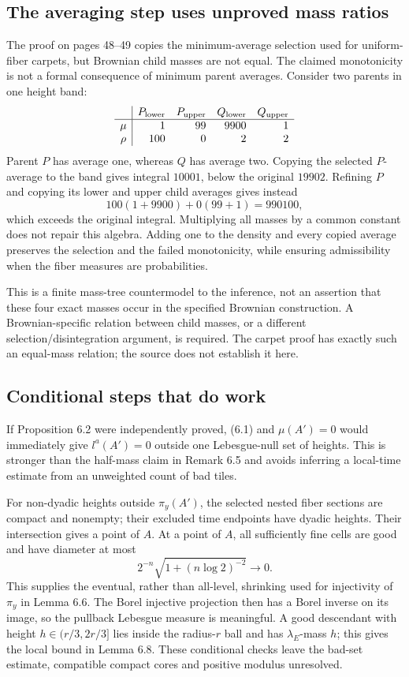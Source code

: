 \documentclass[10pt]{article}
\begin{document}
\subsection*{The averaging step uses unproved mass ratios}
The proof on pages 48–49 copies the minimum-average selection used for uniform-fiber carpets, but Brownian child masses are not equal. The claimed monotonicity is not a formal consequence of minimum parent averages. Consider two parents in one height band: \[\begin{array}{c|rrrr}
 &P_{\rm lower}&P_{\rm upper}&Q_{\rm lower}&Q_{\rm upper}\\
\hline
 \mu&1&99&9900&1\\
 \rho&100&0&2&2
\end{array}\] Parent \(P\) has average one, whereas \(Q\) has average two. Copying the selected \(P\)-average to the band gives integral \(10001\), below the original \(19902\). Refining \(P\) and copying its lower and upper child averages gives instead \[100(1+9900)+0(99+1)=990100,\] which exceeds the original integral. Multiplying all masses by a common constant does not repair this algebra. Adding one to the density and every copied average preserves the selection and the failed monotonicity, while ensuring admissibility when the fiber measures are probabilities.\par
This is a finite mass-tree countermodel to the inference, not an assertion that these four exact masses occur in the specified Brownian construction. A Brownian-specific relation between child masses, or a different selection/disintegration argument, is required. The carpet proof has exactly such an equal-mass relation; the source does not establish it here.\par
\subsection*{Conditional steps that do work}
If Proposition 6.2 were independently proved, (6.1) and \(\mu(A')=0\) would immediately give \(l^a(A')=0\) outside one Lebesgue-null set of heights. This is stronger than the half-mass claim in Remark 6.5 and avoids inferring a local-time estimate from an unweighted count of bad tiles.\par
For non-dyadic heights outside \(\pi_y(A')\), the selected nested fiber sections are compact and nonempty; their excluded time endpoints have dyadic heights. Their intersection gives a point of \(A\). At a point of \(A\), all sufficiently fine cells are good and have diameter at most \[2^{-n}\sqrt{1+(n\log2)^{-2}}\longrightarrow0.\] This supplies the eventual, rather than all-level, shrinking used for injectivity of \(\pi_y\) in Lemma 6.6. The Borel injective projection then has a Borel inverse on its image, so the pullback Lebesgue measure is meaningful. A good descendant with height \(h\in(r/3,2r/3]\) lies inside the radius-\(r\) ball and has \(\lambda_E\)-mass \(h\); this gives the local bound in Lemma 6.8. These conditional checks leave the bad-set estimate, compatible compact cores and positive modulus unresolved.\par
\end{document}
